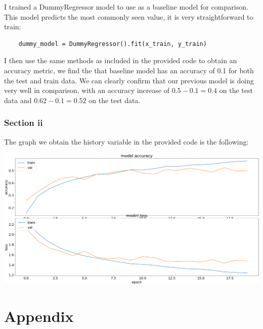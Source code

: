 \documentclass[10pt]{article}
\begin{document}
I trained a DummyRegressor model to use as a baseline model for comparison.
This model predicts the most commonly seen value, it is very
straightforward to train:
\begin{lstlisting}
    dummy_model = DummyRegressor().fit(x_train, y_train)
\end{lstlisting}

I then use the same methods as included in the provided code to
obtain an accuracy metric, we find the that baseline model
has an accuracy of 0.1 for both the test and train data. We can 
clearly confirm that our previous model is doing very well in comparison, with an accuracy increase of
$0.5 - 0.1 = 0.4$ on the test data and $0.62 - 0.1 = 0.52$ on the test data.

\subsubsection{Section ii}
The graph we obtain the history variable in the provided code is the following:

\begin{center}
    \includegraphics[scale=0.3]{default_5k.png}
\end{center}

\section*{Appendix}
\end{document}
